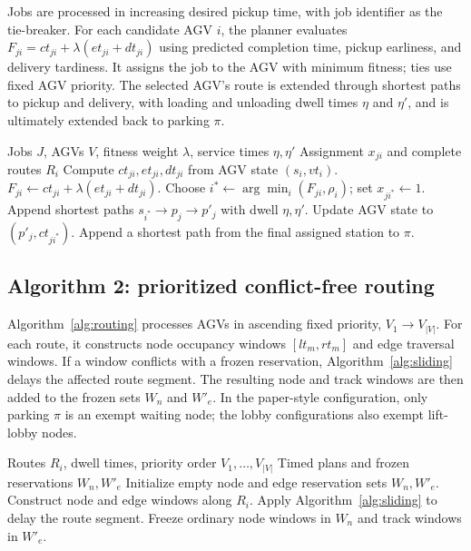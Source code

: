 Jobs are processed in increasing desired pickup time, with job identifier as
the tie-breaker. For each candidate AGV $i$, the planner evaluates
$F_{ji}=ct_{ji}+\lambda(et_{ji}+dt_{ji})$ using predicted completion time,
pickup earliness, and delivery tardiness. It assigns the job to the AGV with
minimum fitness; ties use fixed AGV priority. The selected AGV's route is
extended through shortest paths to pickup and delivery, with loading and
unloading dwell times $\eta$ and $\eta'$, and is ultimately extended back to
parking $\pi$.

\begin{algorithm}[t]
\caption{Prioritized job assignment}
\label{alg:assignment}
\begin{algorithmic}[1]
\REQUIRE Jobs $J$, AGVs $V$, fitness weight $\lambda$, service times $\eta,\eta'$
\ENSURE Assignment $x_{ji}$ and complete routes $R_i$
    \STATE Compute $ct_{ji},et_{ji},dt_{ji}$ from AGV state $(s_i,vt_i)$.
    \STATE $F_{ji}\gets ct_{ji}+\lambda(et_{ji}+dt_{ji})$.
  \ENDFOR
  \STATE Choose $i^*\gets\arg\min_i(F_{ji},\rho_i)$; set $x_{ji^*}\gets1$.
  \STATE Append shortest paths $s_{i^*}\to p_j\to p'_j$ with dwell $\eta,\eta'$.
  \STATE Update AGV state to $(p'_j,ct_{ji^*})$.
\ENDFOR
{}
  \STATE Append a shortest path from the final assigned station to $\pi$.
\ENDFOR
\end{algorithmic}
\end{algorithm}

\subsection{Algorithm 2: prioritized conflict-free routing}

Algorithm~\ref{alg:routing} processes AGVs in ascending fixed priority,
$V_1\rightarrow V_{|V|}$. For each route, it constructs node occupancy
windows $[lt_m,rt_m]$ and edge traversal windows. If a window conflicts with a
frozen reservation, Algorithm~\ref{alg:sliding} delays the affected route
segment. The resulting node and track windows are then added to the frozen
sets $W_n$ and $W'_e$. In the paper-style configuration, only parking $\pi$
is an exempt waiting node; the lobby configurations also exempt lift-lobby
nodes.

\begin{algorithm}[t]
\caption{Prioritized conflict-free routing}
\label{alg:routing}
\begin{algorithmic}[1]
\REQUIRE Routes $R_i$, dwell times, priority order $V_1,\ldots,V_{|V|}$
\ENSURE Timed plans and frozen reservations $W_n,W'_e$
\STATE Initialize empty node and edge reservation sets $W_n,W'_e$.
  \STATE Construct node and edge windows along $R_i$.
    \STATE Apply Algorithm~\ref{alg:sliding} to delay the route segment.
  \ENDFOR
  \STATE Freeze ordinary node windows in $W_n$ and track windows in $W'_e$.
\ENDFOR
\end{algorithmic}
\end{algorithm}


